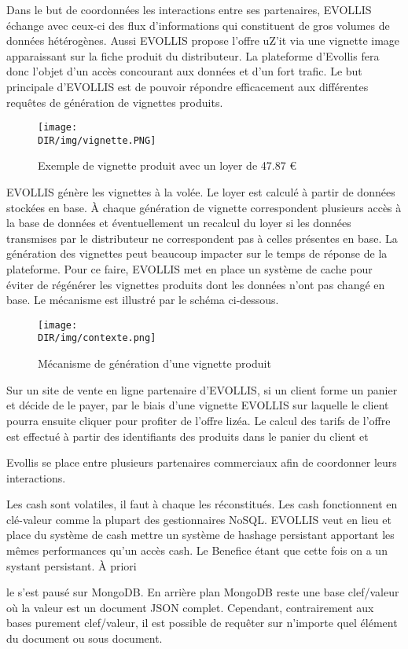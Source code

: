 Dans le but de coordonnées les interactions entre ses partenaires, \textsf{EVOLLIS} 
échange avec ceux-ci des flux d'informations qui constituent de gros volumes de 
données hétérogènes. Aussi \textsf{EVOLLIS} propose l'offre \textsf{uZ'it} via une 
vignette image apparaissant sur la fiche produit du distributeur. La plateforme
d'Evollis fera donc l'objet d'un accès concourant aux données et d'un fort trafic.
Le but principale d'\textsf{EVOLLIS} est de pouvoir répondre efficacement aux 
différentes requêtes de génération de vignettes produits.
\begin {figure}[H]
       \centering
        \texttt{[image: \\DIR/img/vignette.PNG]}	
        \caption{Exemple de vignette produit avec un loyer de 47.87 €}
	\label{sqoop}
  \end {figure}    
\noindent
\textsf{EVOLLIS} génère les vignettes à la volée. Le loyer est calculé à partir de 
données stockées en base. À chaque génération de vignette correspondent plusieurs 
accès à la base de données et éventuellement un recalcul du loyer si les données 
transmises par le distributeur ne correspondent pas à celles présentes en base.
La génération des vignettes peut beaucoup impacter sur le temps de réponse de 
la plateforme. Pour ce faire, \textsf{EVOLLIS} met en place un système de cache
pour éviter de régénérer les vignettes produits dont les données n'ont pas changé en base. 
Le mécanisme est illustré par le schéma ci-dessous.
\begin {figure}[H]
       \centering
        \texttt{[image: \\DIR/img/contexte.png]}	
        \caption{Mécanisme de génération d'une vignette produit}
	\label{sqoop}
  \end {figure}    
\noindent
Sur un site de vente en ligne partenaire d'EVOLLIS, si un client forme un panier et décide de le payer, par le biais d'une vignette EVOLLIS sur laquelle le client pourra ensuite cliquer pour profiter de l'offre \textsf{lizéa}. Le calcul des tarifs de l'offre est effectué  à partir des identifiants des produits dans le panier du client et    


Evollis se place entre plusieurs partenaires commerciaux afin de 
coordonner leurs interactions.


Les cash sont volatiles, il faut à chaque les réconstitués. Les cash
fonctionnent en clé-valeur comme la plupart des gestionnaires NoSQL.
EVOLLIS veut en lieu et place du système de cash mettre un système de
hashage persistant apportant les mêmes performances qu'un accès cash.
Le Benefice étant que cette fois on a un systant persistant. À priori

le s'est pausé sur MongoDB. En arrière plan MongoDB reste une base
clef/valeur où la valeur est un document JSON complet. Cependant,
contrairement aux bases purement clef/valeur, il est possible de
requêter sur n’importe quel élément du document ou sous document.
